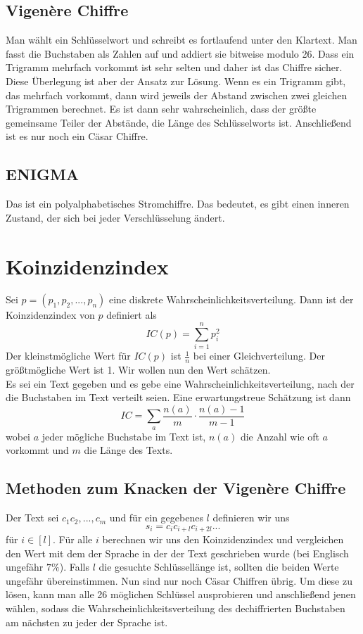 \documentclass[a4paper, 12pt]{article}
\theoremstyle{plain}
\theoremstyle{definition}
\theoremstyle{lemma}
\theoremstyle{remark}
\theoremstyle{corollary}
\theoremstyle{example}
\begin{document}
	\subsection{Vigenère Chiffre}
	Man wählt ein Schlüsselwort und schreibt es fortlaufend unter den Klartext. Man fasst die Buchstaben als Zahlen auf und addiert sie bitweise modulo 26. Dass ein Trigramm mehrfach vorkommt ist sehr selten und daher ist das Chiffre sicher.\\
	Diese Überlegung ist aber der Ansatz zur Lösung. Wenn es ein Trigramm gibt, das mehrfach vorkommt, dann wird jeweils der Abstand zwischen zwei gleichen Trigrammen berechnet. Es ist dann sehr wahrscheinlich, dass der größte gemeinsame Teiler der Abstände, die Länge des Schlüsselworts ist. Anschließend ist es nur noch ein Cäsar Chiffre.
	\subsection{ENIGMA}
	Das ist ein polyalphabetisches Stromchiffre. Das bedeutet, es gibt einen inneren Zustand, der sich bei jeder Verschlüsselung ändert.
	\section{Koinzidenzindex}
	Sei $p=(p_1,p_2,...,p_n)$ eine diskrete Wahrscheinlichkeitsverteilung. Dann ist der Koinzidenzindex von $p$ definiert als \[IC(p) = \sum_{i=1}^{n}p_i^2\] Der kleinstmögliche Wert für $IC(p)$ ist $\frac{1}{n}$ bei einer Gleichverteilung. Der größtmögliche Wert ist 1. Wir wollen nun den Wert schätzen.\\
	Es sei ein Text gegeben und es gebe eine Wahrscheinlichkeitsverteilung, nach der die Buchstaben im Text verteilt seien. Eine erwartungstreue Schätzung ist dann \[IC = \sum_{a} \frac{n(a)}{m}\cdot \frac{n(a)-1}{m-1}\] wobei $a$ jeder mögliche Buchstabe im Text ist, $n(a)$ die Anzahl wie oft $a$ vorkommt und $m$ die Länge des Texts.
	\subsection{Methoden zum Knacken der Vigenère Chiffre}
	Der Text sei $c_1c_2,...,c_m$ und für ein gegebenes $l$ definieren wir uns \[s_i = c_ic_{i+l}c_{i+2l}...\] für $i \in [l]$. Für alle $i$ berechnen wir uns den Koinzidenzindex und vergleichen den Wert mit dem der Sprache in der der Text geschrieben wurde (bei Englisch ungefähr $7\%$). Falls $l$ die gesuchte Schlüssellänge ist, sollten die beiden Werte ungefähr übereinstimmen.
	Nun sind nur noch Cäsar Chiffren übrig. Um diese zu lösen, kann man alle 26 möglichen Schlüssel ausprobieren und anschließend jenen wählen, sodass die Wahrscheinlichkeitsverteilung des dechiffrierten Buchstaben am nächsten zu jeder der Sprache ist.
\end{document}
